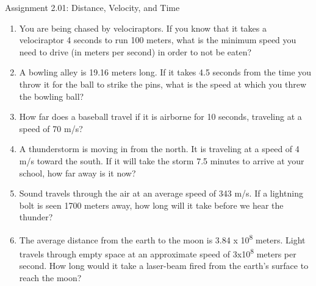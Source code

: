 \documentclass[letterpaper, 12pt]{article}
\begin{document}


\begin{center} Assignment 2.01: Distance, Velocity, and Time
\end{center}





\begin{enumerate}

\item You are being chased by velociraptors.  If you know that it takes a velociraptor 4 seconds to run 100 meters, what is the minimum speed you need to drive (in meters per second) in order to not be eaten?
\vspace{0.75in}

\item A bowling alley is 19.16 meters long.  If it takes 4.5 seconds from the time you throw it for the ball to strike the pins, what is the speed at which you threw the bowling ball?

\vspace{0.75in}
\item How far does a baseball travel if it is airborne for 10 seconds, traveling at a speed of 70 m/s?

\vspace{0.75in}
\item A thunderstorm is moving in from the north.  It is traveling at a speed of 4 m/s toward the south.  If it will take the storm 7.5 minutes to arrive at your school, how far away is it now?


\vspace{0.75in}
\item Sound travels through the air at an average speed of 343 m/s. If a lightning bolt is seen 1700 meters away, how long will it take before we hear the thunder?
\vspace{0.75in}
\item The average distance from the earth to the moon is 3.84 x 10\textsuperscript{8} meters.  Light travels through empty space at an approximate speed of 3x10\textsuperscript{8} meters per second.  How long would it take a laser-beam fired from the earth's surface to reach the moon?


\end{enumerate}
\end{document}
